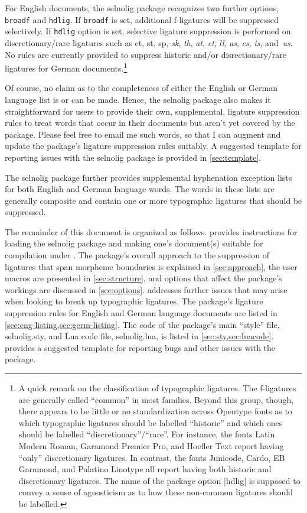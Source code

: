 \documentclass[11pt]{article}
\newcommand{\pkg}[1]{\textsf{#1}}
\newcommand{\opt}[1]{\texttt{#1}}
\begin{document}
\enlargethispage{0.5\baselineskip}

For English documents, the \pkg{selnolig} package recognizes two further options, \opt{broadf} and \opt{hdlig}. If \opt{broadf} is set, additional f-ligatures will be suppressed selectively. If \opt{hdlig} option is set, selective ligature suppression is performed on discretionary\slash rare ligatures such as ct, st, sp, {\ebg\emph{sk}}, \emph{th}, \emph{at}, \emph{et}, \emph{ll}, \emph{as}, \emph{\ebg es}, \emph{is}, and~\emph{us}. No rules are currently provided to suppress historic and/or disrectionary\slash rare ligatures for German documents.\footnote{A quick remark on the classification of typographic ligatures. The f-ligatures are generally called \enquote{common} in most families. Beyond this group, though, there appears to be little or no standardization across Opentype fonts as to which typographic ligatures should be labelled \enquote{historic} and which ones should be labelled \enquote{discretionary}\slash\enquote{rare}. For instance, the fonts Latin Modern Roman, Garamond Premier Pro, and Hoefler Text report having \enquote{only} discretionary ligatures. In contrast, the fonts Junicode, Cardo, EB Garamond, and Palatino Linotype all report having both historic and discretionary ligatures. The name of the package option |hdlig| is supposed to convey a sense of agnosticism as to how these non-common ligatures should be labelled.}

Of course, no claim as to the completeness of either the English or German language list is or can be made. Hence, the \pkg{selnolig} package also makes it straightforward for users to provide their own, supplemental, ligature suppression rules to treat words that occur in their documents but aren't yet covered by the package. Please feel free to email me such words, so that I can augment and update the package's ligature suppression rules suitably. A suggested template for reporting issues with the \pkg{selnolig} package is provided in \cref{sec:template}.

The \pkg{selnolig} package further provides supplemental hyphenation exception lists for both English and German language words. The words in these lists are generally composite and contain one or more typographic ligatures that should be suppressed.

The remainder of this document is organized as follows.  provides instructions for loading the \pkg{selnolig} package and making one's document(s) suitable for compilation under \LuaLaTeX. The package's overall approach to the suppression of ligatures that span morpheme boundaries is explained in \cref{sec:approach}, the user macros are presented in \cref{sec:structure}, and options that affect the package's workings are discussed in \cref{sec:options}.  addresses further issues that may arise when looking to break up typographic ligatures. The package's ligature suppression rules for English and German language documents are listed in \cref{sec:eng-listing,sec:germ-listing}. The code of the package's main ``style'' file, \pkg{selnolig.sty}, and Lua code file,  \pkg{selnolig.lua}, is listed in \cref{sec:sty,sec:luacode}.  provides a suggested template for reporting bugs and other issues with the package. 
\end{document}
